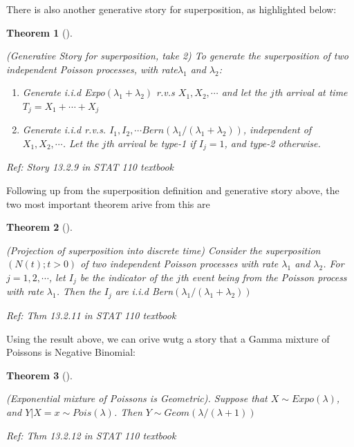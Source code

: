 \documentclass[
  letterpaper,
  DIV=11,
  numbers=noendperiod]{scrreprt}
\theoremstyle{definition}
\theoremstyle{plain}
\newtheorem{theorem}{Theorem}[chapter]
\theoremstyle{remark}
\begin{document}
There is also another generative story for superposition, as highlighted
below:

\leavevmode{}%
\begin{theorem}[]\label{thm-poisson-story-superposition-2}

(Generative Story for superposition, take 2) To generate the
superposition of two independent Poisson processes, with
rate\(\lambda_1\) and \(\lambda_2\):

\begin{enumerate}
\def\labelenumi{\arabic{enumi}.}
\item
  Generate i.i.d Expo\((\lambda_1 +\lambda_2)\) r.v.s
  \(X_1, X_2,\cdots\) and let the \(j\)th arrival at time
  \(T_j =X_1+\cdots+X_j\)
\item
  Generate i.i.d r.v.s.
  \(I_1, I_2, \cdots Bern(\lambda_1/(\lambda_1+\lambda_2))\),
  independent of \(X_1, X_2, \cdots\). Let the \(j\)th arrival be type-1
  if \(I_j=1\), and type-2 otherwise.
\end{enumerate}

\emph{Ref: Story 13.2.9 in STAT 110 textbook}

\end{theorem}

Following up from the superposition definition and generative story
above, the two most important theorem arive from this are

\leavevmode{}%
\begin{theorem}[]\label{thm-superposition-discrete}

(Projection of superposition into discrete time) Consider the
superposition \((N(t);t>0)\) of two independent Poisson processes with
rate \(\lambda_1\) and \(\lambda_2\). For \(j=1,2,\cdots\), let \(I_j\)
be the indicator of the \(j\)th event being from the Poisson process
with rate \(\lambda_1\). Then the \(I_j\) are i.i.d
Bern\((\lambda_1/(\lambda_1+\lambda_2))\)

\emph{Ref: Thm 13.2.11 in STAT 110 textbook}

\end{theorem}

Using the result above, we can orive wutg a story that a Gamma mixture
of Poissons is Negative Binomial:

\leavevmode{}%
\begin{theorem}[]\label{thm-mixture-poisson}

(Exponential mixture of Poissons is Geometric). Suppose that
\(X \sim Expo(\lambda)\), and \(Y|X=x \sim Pois(\lambda)\). Then
\(Y\sim Geom(\lambda/(\lambda+1))\)

\emph{Ref: Thm 13.2.12 in STAT 110 textbook}

\end{theorem}
\end{document}
